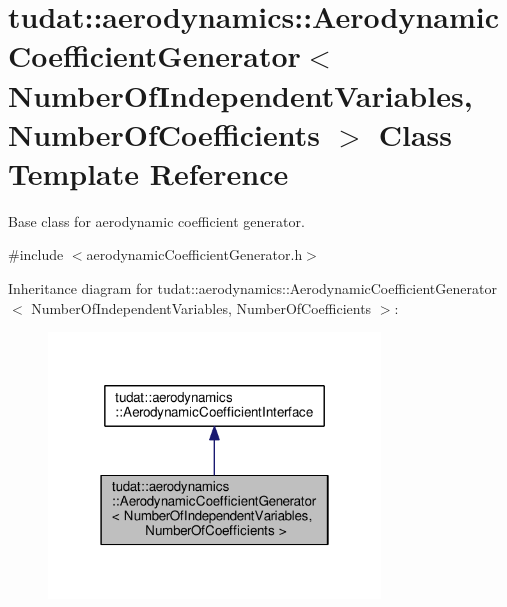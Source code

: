 \hypertarget{classtudat_1_1aerodynamics_1_1AerodynamicCoefficientGenerator}{}\section{tudat\+:\+:aerodynamics\+:\+:Aerodynamic\+Coefficient\+Generator$<$ Number\+Of\+Independent\+Variables, Number\+Of\+Coefficients $>$ Class Template Reference}
\label{classtudat_1_1aerodynamics_1_1AerodynamicCoefficientGenerator}


Base class for aerodynamic coefficient generator.  




{\ttfamily \#include $<$aerodynamic\+Coefficient\+Generator.\+h$>$}



Inheritance diagram for tudat\+:\+:aerodynamics\+:\+:Aerodynamic\+Coefficient\+Generator$<$ Number\+Of\+Independent\+Variables, Number\+Of\+Coefficients $>$\+:
\nopagebreak
\begin{figure}[H]
\begin{center}
\leavevmode
\includegraphics[width=250pt]{classtudat_1_1aerodynamics_1_1AerodynamicCoefficientGenerator__inherit__graph}
\end{center}
\end{figure}



